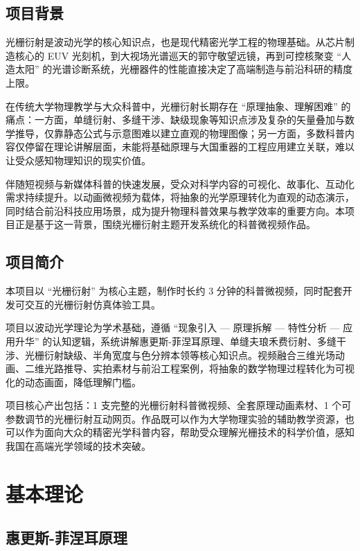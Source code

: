 \documentclass[12pt,a4paper]{ctexrep}
\begin{document}
\section{项目背景}

光栅衍射是波动光学的核心知识点，也是现代精密光学工程的物理基础。从芯片制造核心的 EUV 光刻机，到大视场光谱巡天的郭守敬望远镜，再到可控核聚变 “人造太阳” 的光谱诊断系统，光栅器件的性能直接决定了高端制造与前沿科研的精度上限。

在传统大学物理教学与大众科普中，光栅衍射长期存在 “原理抽象、理解困难” 的痛点：一方面，单缝衍射、多缝干涉、缺级现象等知识点涉及复杂的矢量叠加与数学推导，仅靠静态公式与示意图难以建立直观的物理图像；另一方面，多数科普内容仅停留在理论讲解层面，未能将基础原理与大国重器的工程应用建立关联，难以让受众感知物理知识的现实价值。

伴随短视频与新媒体科普的快速发展，受众对科学内容的可视化、故事化、互动化需求持续提升。以动画微视频为载体，将抽象的光学原理转化为直观的动态演示，同时结合前沿科技应用场景，成为提升物理科普效果与教学效率的重要方向。本项目正是基于这一背景，围绕光栅衍射主题开发系统化的科普微视频作品。

\section{项目简介}

本项目以 “光栅衍射” 为核心主题，制作时长约 3 分钟的科普微视频，同时配套开发可交互的光栅衍射仿真体验工具。

项目以波动光学理论为学术基础，遵循 “现象引入 — 原理拆解 — 特性分析 — 应用升华” 的认知逻辑，系统讲解惠更斯-菲涅耳原理、单缝夫琅禾费衍射、多缝干涉、光栅衍射缺级、半角宽度与色分辨本领等核心知识点。视频融合三维光场动画、二维光路推导、实拍素材与前沿工程案例，将抽象的数学物理过程转化为可视化的动态画面，降低理解门槛。

项目核心产出包括：1 支完整的光栅衍射科普微视频、全套原理动画素材、1 个可参数调节的光栅衍射互动网页。作品既可以作为大学物理实验的辅助教学资源，也可以作为面向大众的精密光学科普内容，帮助受众理解光栅技术的科学价值，感知我国在高端光学领域的技术突破。

\chapter{基本理论}

\section{惠更斯-菲涅耳原理}
\end{document}
